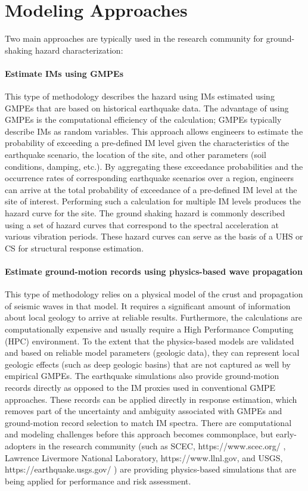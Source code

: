 \section{Modeling Approaches}
\label{sec:eq_shake_models}

Two main approaches are typically used in the research community for ground-shaking hazard characterization:

\paragraph{Estimate IMs using GMPEs} This type of methodology describes the hazard using IMs estimated using GMPEs that are based on historical earthquake data. The advantage of using GMPEs is the computational efficiency of the calculation; GMPEs typically describe IMs as random variables. This approach allows engineers to estimate the probability of exceeding a pre-defined IM level given the characteristics of the earthquake scenario, the location of the site, and other parameters (soil conditions, damping, etc.). By aggregating these exceedance probabilities and the occurrence rates of corresponding earthquake scenarios over a region, engineers can arrive at the total probability of exceedance of a pre-defined IM level at the site of interest. Performing such a calculation for multiple IM levels produces the hazard curve for the site. The ground shaking hazard is commonly described using a set of hazard curves that correspond to the spectral acceleration at various vibration periods. These hazard curves can serve as the basis of a UHS or CS for structural response estimation.

\paragraph{Estimate ground-motion records using physics-based wave propagation} This type of methodology relies on a physical model of the crust and propagation of seismic waves in that model. It requires a significant amount of information about local geology to arrive at reliable results. Furthermore, the calculations are computationally expensive and usually require a High Performance Computing (HPC) environment. To the extent that the physics-based models are validated and based on reliable model parameters (geologic data), they can represent local geologic effects (such as deep geologic basins) that are not captured as well by empirical GMPEs. The earthquake simulations also provide ground-motion records directly as opposed to the IM proxies used in conventional GMPE approaches. These records can be applied directly in response estimation, which removes part of the uncertainty and ambiguity associated with GMPEs and ground-motion record selection to match IM spectra. There are computational and modeling challenges before this approach becomes commonplace, but early-adopters in the research community (such as SCEC, https://www.scec.org/ , Lawrence Livermore National Laboratory, https://www.llnl.gov, and USGS, https://earthquake.usgs.gov/ ) are providing physics-based simulations that are being applied for performance and risk assessment.

